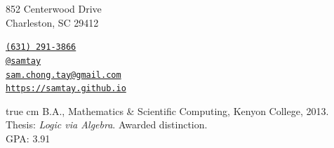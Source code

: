 \documentclass[11pt,article,oneside]{memoir}
\makeatletter
\def\myemail{sam.chong.tay@gmail.com}
\def\myweb{https://samtay.github.io}
\def\myphone{(631) 291-3866}
\def\mygithub{@samtay}
\makeatother
\begin{document}
\renewcommand{\labelitemi}{~} 

\def\ind{\hangindent=1 true cm\hangafter=1 \noindent}
\def\labelitemi{~}
\renewcommand{\labelitemii}{~}


\pagestyle{kjh}


\hfill
\begin{minipage}[t]{2.95in}
  \vspace{0.34in}
  \flushright
    {\footnotesize 852 Centerwood Drive \\ \vspace{-0.05in} Charleston, \textsc{SC} 29412}  
\end{minipage}
\hfill
\begin{minipage}[t]{1.6in}
  \flushright
    {\footnotesize  \texttt{\href{tel:\myphone}{\myphone}} \, \faPhone} \\
    {\footnotesize  \texttt{\href{https://github.com/samtay}{\mygithub}} \, \faGithub}  \\ 
    {\footnotesize  \texttt{\href{mailto:\myemail}{\myemail}} \, \faEnvelope} \\
    {\footnotesize  \texttt{\href{\myweb}{\myweb}} \, \faGlobe}
\end{minipage}


\vspace{-1em}
\reversemarginpar

\bigskip
\medskip


\ind B.A., Mathematics \& Scientific Computing, Kenyon College, 2013. \\
\footnotesize
  Thesis: \emph{Logic via Algebra}. Awarded distinction. \\
  GPA: 3.91
\normalsize
\vspace{0.05in}
\end{document}
